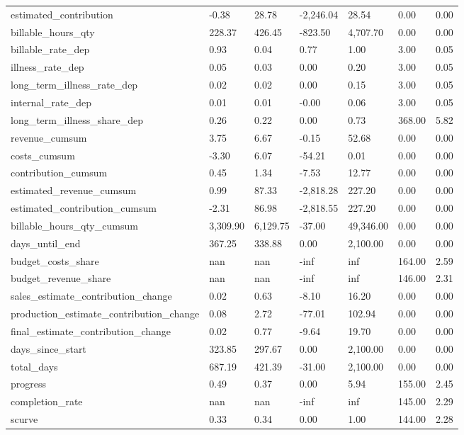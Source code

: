 \begin{landscape}
\begin{longtable}[h!]{lllllll}
estimated_contribution & -0.38 & 28.78 & -2,246.04 & 28.54 & 0.00 & 0.00 \\
billable_hours_qty & 228.37 & 426.45 & -823.50 & 4,707.70 & 0.00 & 0.00 \\
billable_rate_dep & 0.93 & 0.04 & 0.77 & 1.00 & 3.00 & 0.05 \\
illness_rate_dep & 0.05 & 0.03 & 0.00 & 0.20 & 3.00 & 0.05 \\
long_term_illness_rate_dep & 0.02 & 0.02 & 0.00 & 0.15 & 3.00 & 0.05 \\
internal_rate_dep & 0.01 & 0.01 & -0.00 & 0.06 & 3.00 & 0.05 \\
long_term_illness_share_dep & 0.26 & 0.22 & 0.00 & 0.73 & 368.00 & 5.82 \\
revenue_cumsum & 3.75 & 6.67 & -0.15 & 52.68 & 0.00 & 0.00 \\
costs_cumsum & -3.30 & 6.07 & -54.21 & 0.01 & 0.00 & 0.00 \\
contribution_cumsum & 0.45 & 1.34 & -7.53 & 12.77 & 0.00 & 0.00 \\
estimated_revenue_cumsum & 0.99 & 87.33 & -2,818.28 & 227.20 & 0.00 & 0.00 \\
estimated_contribution_cumsum & -2.31 & 86.98 & -2,818.55 & 227.20 & 0.00 & 0.00 \\
billable_hours_qty_cumsum & 3,309.90 & 6,129.75 & -37.00 & 49,346.00 & 0.00 & 0.00 \\
days_until_end & 367.25 & 338.88 & 0.00 & 2,100.00 & 0.00 & 0.00 \\
budget_costs_share & nan & nan & -inf & inf & 164.00 & 2.59 \\
budget_revenue_share & nan & nan & -inf & inf & 146.00 & 2.31 \\
sales_estimate_contribution_change & 0.02 & 0.63 & -8.10 & 16.20 & 0.00 & 0.00 \\
production_estimate_contribution_change & 0.08 & 2.72 & -77.01 & 102.94 & 0.00 & 0.00 \\
final_estimate_contribution_change & 0.02 & 0.77 & -9.64 & 19.70 & 0.00 & 0.00 \\
days_since_start & 323.85 & 297.67 & 0.00 & 2,100.00 & 0.00 & 0.00 \\
total_days & 687.19 & 421.39 & -31.00 & 2,100.00 & 0.00 & 0.00 \\
progress & 0.49 & 0.37 & 0.00 & 5.94 & 155.00 & 2.45 \\
completion_rate & nan & nan & -inf & inf & 145.00 & 2.29 \\
scurve & 0.33 & 0.34 & 0.00 & 1.00 & 144.00 & 2.28 \\

\end{longtable}
\end{landscape}
